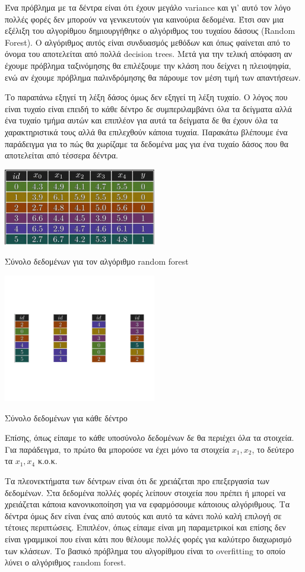 Ένα πρόβλημα με τα δέντρα είναι ότι έχουν μεγάλο \textlatin{variance} και γι' αυτό τον λόγο πολλές
φορές δεν μπορούν να γενικευτούν για καινούρια δεδομένα. Έτσι σαν μια εξέλιξη του αλγορίθμου
δημιουργήθηκε ο αλγόριθμος του τυχαίου δάσους (\textlatin{Random Forest}). Ο αλγόριθμος αυτός
είναι συνδυασμός μεθόδων και όπως φαίνεται από το όνομα του αποτελείται από πολλά
\textlatin{decision trees}. Μετά για την τελική απόφαση αν έχουμε πρόβλημα ταξινόμησης θα
επιλέξουμε την κλάση που δείχνει η πλειοψηφία, ενώ αν έχουμε πρόβλημα παλινδρόμησης θα πάρουμε
τον μέση τιμή των απαντήσεων\cite{wikirf}.

Το παραπάνω εξηγεί τη λέξη δάσος όμως δεν εξηγεί τη λέξη τυχαίο. Ο λόγος που είναι τυχαίο είναι
επειδή το κάθε δέντρο δε συμπεριλαμβάνει όλα τα δείγματα αλλά ένα τυχαίο τμήμα αυτών και επιπλέον
για αυτά τα δείγματα δε θα έχουν όλα τα χαρακτηριστικά τους αλλά θα επιλεχθούν κάποια τυχαία.
Παρακάτω βλέπουμε ένα παράδειγμα για το πώς θα χωρίζαμε τα δεδομένα μας για ένα τυχαίο δάσος που
θα αποτελείται από τέσσερα δέντρα.
\begin{table}[H]
    \centering
    \includegraphics[width=0.5\textwidth]{images/random_forest.png}
    \caption{Σύνολο δεδομένων για τον αλγόριθμο \textlatin{random forest}}
\end{table}
\begin{table}[H]
    \centering
    \includegraphics[width=0.5\textwidth]{images/random_forest_split.png}
    \caption{Σύνολο δεδομένων για κάθε δέντρο}
\end{table}

Επίσης, όπως είπαμε το κάθε υποσύνολο δεδομένων δε θα περιέχει όλα τα στοιχεία. Για παράδειγμα, το
πρώτο θα μπορούσε να έχει μόνο τα στοιχεία $x_1,x_2$, το δεύτερο τα $x_1,x_4$ κ.ο.κ.

Τα πλεονεκτήματα των δέντρων είναι ότι δε χρειάζεται προ επεξεργασία των δεδομένων. Στα δεδομένα
πολλές φορές λείπουν στοιχεία που πρέπει ή μπορεί να χρειάζεται κάποια κανονικοποίηση για να
εφαρμόσουμε κάποιους αλγόριθμους. Τα δέντρα όμως δεν είναι ένας από αυτούς και αυτό τα κάνει πολύ
καλή επιλογή σε τέτοιες περιπτώσεις. Επιπλέον, όπως είπαμε είναι μη παραμετρικοί και επίσης
δεν είναι γραμμικοί που είναι κάτι που θέλουμε πολλές φορές για καλύτερο διαχωρισμό των
κλάσεων\cite{dtreeadv}.
Το βασικό πρόβλημα του αλγορίθμου είναι το \textlatin{overfitting} το οποίο λύνει ο αλγόριθμος
\textlatin{random forest}.
